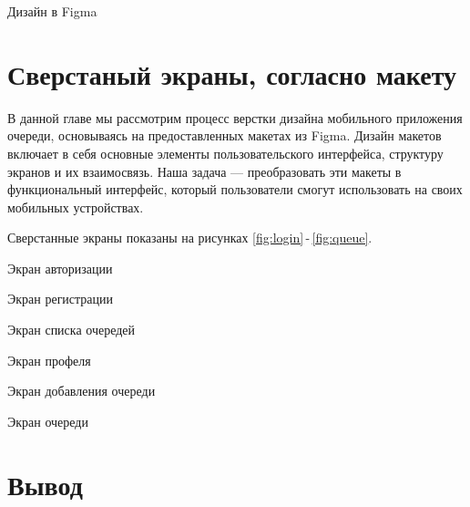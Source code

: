 \begin{image}
	\caption{Дизайн в Figma}
	\label{fig:figma}
\end{image}

\section{Сверстаный экраны, согласно макету}

В данной главе мы рассмотрим процесс верстки дизайна мобильного приложения
очереди, основываясь на предоставленных макетах из Figma.
Дизайн макетов включает в себя основные элементы пользовательского интерфейса,
структуру экранов и их взаимосвязь.
Наша задача --- преобразовать эти макеты в функциональный интерфейс,
который пользователи смогут использовать на своих мобильных устройствах.

Сверстанные экраны показаны на рисунках \ref{fig:login}\,-\,\ref{fig:queue}.

\begin{image}
	\caption{Экран авторизации}
	\label{fig:login}
\end{image}

\begin{image}
	\caption{Экран регистрации}
	\label{fig:signup}
\end{image}

\begin{image}
	\caption{Экран списка очередей}
	\label{fig:queue:list}
\end{image}

\begin{image}
	\caption{Экран профеля}
	\label{fig:profile}
\end{image}

\begin{image}
	\caption{Экран добавления очереди}
	\label{fig:queue:add}
\end{image}

\begin{image}
	\caption{Экран очереди}
	\label{fig:queue}
\end{image}

\clearpage

\section*{\LARGE Вывод}


